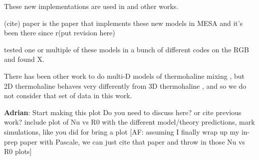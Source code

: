 These new implementations are used in \citep{bauer_bildsten_2019} and other works.

(cite) paper is the paper that implements these new models in MESA and it's been there since r(put revision here)

\citet{lattanzio_etal_2015} tested one or multiple of these models in a bunch of different codes on the RGB and found X.

There has been other work to do multi-D models of thermohaline mixing \citep{denissenkov_2010, denissenkov_merryfield_2011}, but 2D thermohaline behaves very differently from 3D thermohaline \citep{garaud_brummell_2015}, and so we do not consider that set of data in this work.

\textbf{Adrian}: Start making this plot
Do you need to discuss here? or cite previous work? include plot of Nu vs R0 with the different model/theory predictions, mark simulations, like you did for bring a plot [AF: assuming I finally wrap up my in-prep paper with Pascale, we can just cite that paper and throw in those Nu vs R0 plots]